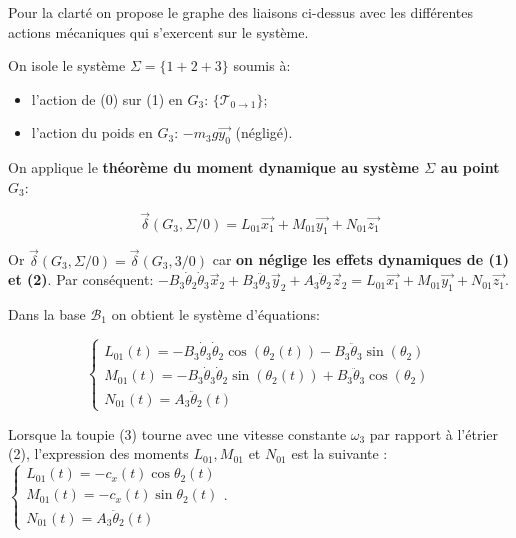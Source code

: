 \begin{corrige}
Pour la clarté on propose le graphe des liaisons ci-dessus avec les différentes actions mécaniques qui s'exercent sur le système.


On isole le système $\Sigma = \{ 1+2+3 \}$ soumis à:
\begin{itemize}
\item l'action de (0) sur (1) en $G_3$: $\{\mathcal{T}_{0 \to 1}\}$;
\item l'action du poids en $G_3$: $-m_3 g \overrightarrow{y_0}$ (négligé).
\end{itemize}

On applique le \textbf{théorème du moment dynamique au système $\Sigma$ au point $G_3$}:

$$ \boxed{\overrightarrow{\delta}(G_3,\Sigma/0) = L_{01}\overrightarrow{x_1} + M_{01}\overrightarrow{y_1} + N_{01}\overrightarrow{z_1}} $$

Or $\overrightarrow{\delta}(G_3,\Sigma/0) = \overrightarrow{\delta}(G_3,3/0)$ car \textbf{on néglige les effets dynamiques de (1) et (2)}. Par conséquent:
$ -B_3\dot{\theta}_2\dot{\theta}_3\overrightarrow{x}_2 + B_3 \ddot{\theta}_3\overrightarrow{y}_2 + A_3\ddot{\theta}_{2}\overrightarrow{z}_2 = L_{01}\overrightarrow{x_1} + M_{01}\overrightarrow{y_1} + N_{01}\overrightarrow{z_1}$.

Dans la base $\mathcal{B}_1$ on obtient le système d'équations:

$$
\left\{
\begin{array}{ll}
L_{01}(t) = - B_3 \dot{\theta}_3\dot{\theta}_2 \cos(\theta_2(t)) - B_3 \ddot{\theta}_3 \sin(\theta_2)  \\
M_{01}(t) = - B_3 \dot{\theta}_3\dot{\theta}_2 \sin(\theta_2(t)) + B_3 \ddot{\theta}_3 \cos(\theta_2) \\
N_{01}(t) = A_3 \ddot{\theta}_2(t)
\end{array}
\right.
$$
 
\end{corrige}
\else
\fi

\ifprof
\else
Lorsque la toupie (3) tourne avec une vitesse constante $\omega_{3}$ par rapport à l'étrier (2), l'expression des moments $L_{01}, M_{01}$ et $N_{01}$ est la suivante :
$
\left\{\begin{array}{l}
L_{01}(t)=-c_{x}(t) \cos \theta_{2}(t) \\
M_{01}(t)=-c_{x}(t) \sin \theta_{2}(t) \\
N_{01}(t)=A_{3} \ddot{\theta}_{2}(t)
\end{array}\right.
$.

